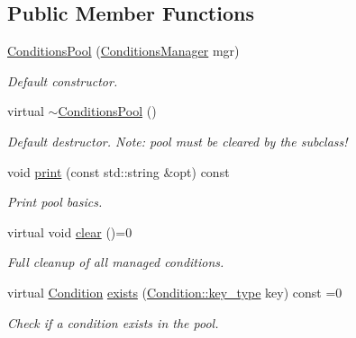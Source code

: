 \subsection*{Public Member Functions}
\begin{DoxyCompactItemize}
\item 
\hyperlink{class_d_d4hep_1_1_conditions_1_1_conditions_pool_a4aec4f20a1422387f1814fdcb75f66c1}{ConditionsPool} (\hyperlink{class_d_d4hep_1_1_conditions_1_1_conditions_manager}{ConditionsManager} mgr)
\begin{DoxyCompactList}\small\item\em Default constructor. \item\end{DoxyCompactList}\item 
virtual \hyperlink{class_d_d4hep_1_1_conditions_1_1_conditions_pool_a33a9ee6f763731cf1fd02b8a102b5217}{$\sim$ConditionsPool} ()
\begin{DoxyCompactList}\small\item\em Default destructor. Note: pool must be cleared by the subclass! \item\end{DoxyCompactList}\item 
void \hyperlink{class_d_d4hep_1_1_conditions_1_1_conditions_pool_ab1af771f53b52f857ce4e127ad18ee32}{print} (const std::string \&opt) const 
\begin{DoxyCompactList}\small\item\em Print pool basics. \item\end{DoxyCompactList}\item 
virtual void \hyperlink{class_d_d4hep_1_1_conditions_1_1_conditions_pool_aaa515e23b412a5da244f6c4e6bf13220}{clear} ()=0
\begin{DoxyCompactList}\small\item\em Full cleanup of all managed conditions. \item\end{DoxyCompactList}\item 
virtual \hyperlink{class_d_d4hep_1_1_conditions_1_1_condition}{Condition} \hyperlink{class_d_d4hep_1_1_conditions_1_1_conditions_pool_aa37de3a69489da065b3515c7119b3145}{exists} (\hyperlink{class_d_d4hep_1_1_conditions_1_1_condition_a7528efa762e8cc072ef80ea67c3531f9}{Condition::key\_\-type} key) const =0
\begin{DoxyCompactList}\small\item\em Check if a condition exists in the pool. \item\end{DoxyCompactList}\item 

\end{DoxyCompactItemize}
